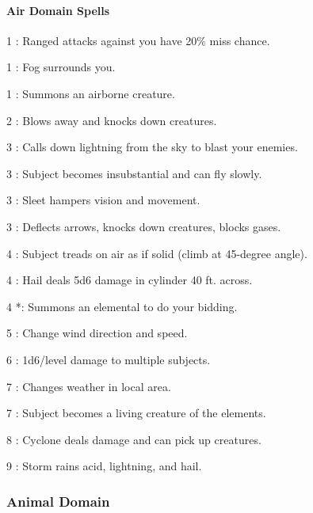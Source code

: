 \paragraph{Air Domain Spells}
\begin{list}{}{\leftmargin=1em}
\item[1] : Ranged attacks against you have 20\% miss chance.
\item[1] : Fog surrounds you.
\item[1] : Summons an airborne creature.
\item[2] : Blows away and knocks down creatures.
\item[3] : Calls down lightning from the sky to blast your enemies.
\item[3] : Subject becomes insubstantial and can fly slowly.
\item[3] : Sleet hampers vision and movement.
\item[3] : Deflects arrows, knocks down creatures, blocks gases.
\item[4] : Subject treads on air as if solid (climb at 45-degree angle).
\item[4] : Hail deals 5d6 damage in cylinder 40 ft. across.
\item[4] *: Summons an elemental to do your bidding.
\item[5] : Change wind direction and speed.
\item[6] : 1d6/level damage to multiple subjects.
\item[7] : Changes weather in local area.
\item[7] : Subject becomes a living creature of the elements.
\item[8] : Cyclone deals damage and can pick up creatures.
\item[9] : Storm rains acid, lightning, and hail.
\end{list}
\subsubsection{Animal Domain}
\label{Domain:Animal}
